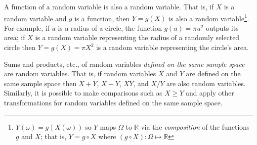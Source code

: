 \documentclass[
  letterpaper,
  DIV=11,
  numbers=noendperiod]{scrreprt}
\theoremstyle{plain}
\theoremstyle{definition}
\theoremstyle{definition}
\theoremstyle{definition}
\theoremstyle{remark}
\begin{document}
A function of a random variable is also a random variable. That is, if
\(X\) is a random variable and \(g\) is a function, then \(Y=g(X)\) is
also a random variable\footnote{\(Y(\omega) = g(X(\omega))\) so \(Y\)
  maps \(\Omega\) to \(\mathbb{R}\) via the \emph{composition} of the
  functions \(g\) and \(X\); that is, \(Y=g\circ X\) where
  \((g\circ X):\Omega\mapsto \mathbb{R}\)}. For example, if \(u\) is a
radius of a circle, the function \(g(u) = \pi u^2\) outputs its area; if
\(X\) is a random variable representing the radius of a randomly
selected circle then \(Y = g(X)=\pi X^2\) is a random variable
representing the circle's area.

Sums and products, etc., of random variables \emph{defined on the same
sample space} are random variables. That is, if random variables \(X\)
and \(Y\) are defined on the same sample space then \(X+Y\), \(X-Y\),
\(XY\), and \(X/Y\) are also random variables. Similarly, it is possible
to make comparisons such as \(X\ge Y\) and apply other transformations
for random variables defined on the same sample space.
\end{document}
